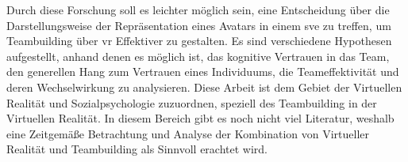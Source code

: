 \documentclass[a4paper,11pt]{article}%
\renewcommand{\\}{\vspace*{0.5\baselineskip} \newline}
\begin{document}
	Durch diese Forschung soll es leichter möglich sein, eine Entscheidung über die Darstellungsweise der Repräsentation eines Avatars in einem \ac{sve} zu treffen, um Teambuilding über \ac{vr} Effektiver zu gestalten.\\
	Es sind verschiedene Hypothesen aufgestellt, anhand denen es möglich ist, das kognitive Vertrauen in das Team, den generellen Hang zum Vertrauen eines Individuums, die Teameffektivität und deren Wechselwirkung zu analysieren.
	Diese Arbeit ist dem Gebiet der Virtuellen Realität und Sozialpsychologie zuzuordnen, speziell des Teambuilding in der Virtuellen Realität.
	In diesem Bereich gibt es noch nicht viel Literatur, weshalb eine Zeitgemäße Betrachtung und Analyse der Kombination von Virtueller Realität und Teambuilding als Sinnvoll erachtet wird.\\

\end{document}
